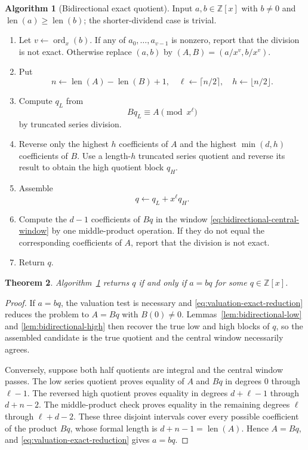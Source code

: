 \documentclass[11pt]{book}
\newtheorem{theorem}{Theorem}[section]
\theoremstyle{definition}
\newtheorem{algorithm}[theorem]{Algorithm}
\newcommand{\ZZ}{\mathbb Z}
\newcommand{\len}{\operatorname{len}}
\begin{document}
\begin{algorithm}[Bidirectional exact quotient]\label{alg:bidirectional-exact}
Input $a,b\in\ZZ[x]$ with $b\ne0$ and $\len(a)\geq\len(b)$; the
shorter-dividend case is trivial.
\begin{enumerate}
 \item Let $v\leftarrow\operatorname{ord}_x(b)$.  If any of
 $a_0,\ldots,a_{v-1}$ is nonzero, report that the division is not exact.
 Otherwise replace $(a,b)$ by $(A,B)=(a/x^v,b/x^v)$.
 \item Put
 \[
 n\leftarrow\len(A)-\len(B)+1,
 \quad
 \ell\leftarrow\lceil n/2\rceil,
 \quad
 h\leftarrow\lfloor n/2\rfloor.
 \]
 \item Compute $q_L$ from
 \[
 Bq_L\equiv A\pmod{x^\ell}
 \]
 by truncated series division.
 \item Reverse only the highest $h$ coefficients of $A$ and the highest
 $\min(d,h)$ coefficients of $B$.  Use a length-$h$ truncated series quotient
 and reverse its result to obtain the high quotient block $q_H$.
 \item Assemble
 \[
 q\leftarrow q_L+x^\ell q_H.
 \]
 \item Compute the $d-1$ coefficients of $Bq$ in the window
 \eqref{eq:bidirectional-central-window} by one middle-product operation.  If
 they do not equal the corresponding coefficients of $A$, report that the
 division is not exact.
 \item Return $q$.
\end{enumerate}
\end{algorithm}

\begin{theorem}\label{thm:bidirectional-exact-correctness}
Algorithm~\ref{alg:bidirectional-exact} returns $q$ if and only if $a=bq$ for
some $q\in\ZZ[x]$.
\end{theorem}

\begin{proof}
If $a=bq$, the valuation test is necessary and
\eqref{eq:valuation-exact-reduction} reduces the problem to $A=Bq$ with
$B(0)\ne0$.  Lemmas~\ref{lem:bidirectional-low} and
\ref{lem:bidirectional-high} then recover the true low and high blocks of
$q$, so the assembled candidate is the true quotient and the central window
necessarily agrees.

Conversely, suppose both half quotients are integral and the central window
passes.  The low series quotient proves equality of $A$ and $Bq$ in degrees
$0$ through $\ell-1$.  The reversed high quotient proves equality in degrees
$d+\ell-1$ through $d+n-2$.  The middle-product check proves equality in the
remaining degrees $\ell$ through $\ell+d-2$.  These three disjoint intervals
cover every possible coefficient of the product $Bq$, whose formal length is
$d+n-1=\len(A)$.  Hence $A=Bq$, and
\eqref{eq:valuation-exact-reduction} gives $a=bq$.
\end{proof}
\end{document}
